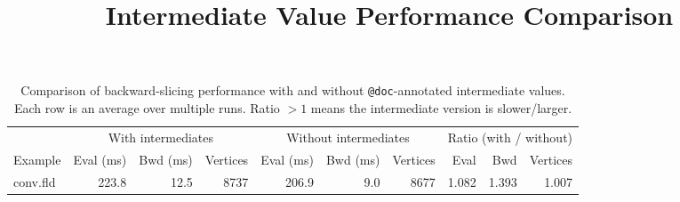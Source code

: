 \documentclass{article}
\title{Intermediate Value Performance Comparison}
\date{}
\begin{document}
\maketitle

\begin{table}[h]
\centering
\begin{tabular}{l r r r r r r r r r}
\toprule
 & \multicolumn{3}{c}{With intermediates}
 & \multicolumn{3}{c}{Without intermediates}
 & \multicolumn{3}{c}{Ratio (with / without)} \\
\cmidrule(lr){2-4} \cmidrule(lr){5-7} \cmidrule(lr){8-10}
Example
 & {Eval (ms)} & {Bwd (ms)} & {Vertices}
 & {Eval (ms)} & {Bwd (ms)} & {Vertices}
 & {Eval}      & {Bwd}      & {Vertices} \\
\midrule
conv.fld & 223.8 & 12.5 & 8737 & 206.9 & 9.0 & 8677 & 1.082 & 1.393 & 1.007 \\
\bottomrule
\end{tabular}
\caption{Comparison of backward-slicing performance with and without \texttt{@doc}-annotated intermediate values.
         Each row is an average over multiple runs. Ratio $> 1$ means the intermediate version is slower/larger.}
\label{tab:intermediate-perf}
\end{table}
\end{document}
